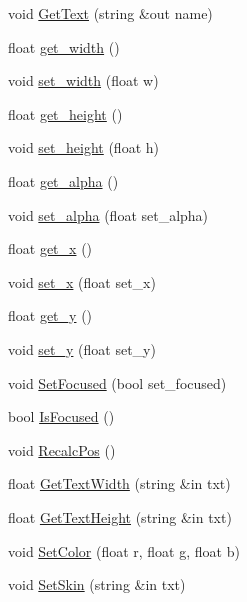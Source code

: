 \begin{DoxyCompactItemize}
\item 
void \hyperlink{class_g_u_i_label_af00099b304803c7f5651e5feadccf577}{Get\+Text} (string \&out name)
\item 
float \hyperlink{class_g_u_i_label_a19fc8eec7e832bf7b4371e61696c7a79}{get\+\_\+width} ()
\item 
void \hyperlink{class_g_u_i_label_a7d1513ef0f3b75fb17165b0a2ef077f3}{set\+\_\+width} (float w)
\item 
float \hyperlink{class_g_u_i_label_ac21bf1bcf1c89b92ea6369a6b1bbfe28}{get\+\_\+height} ()
\item 
void \hyperlink{class_g_u_i_label_ada3b44dba6446d9159e394360a480847}{set\+\_\+height} (float h)
\item 
float \hyperlink{class_g_u_i_label_a76e2bc539833f4f9bee774788d9da581}{get\+\_\+alpha} ()
\item 
void \hyperlink{class_g_u_i_label_a995d9405500c145f733ac4b35166e99e}{set\+\_\+alpha} (float set\+\_\+alpha)
\item 
float \hyperlink{class_g_u_i_label_ae6fe682d14ac2d4a70f3b1c85080608d}{get\+\_\+x} ()
\item 
void \hyperlink{class_g_u_i_label_a94ff861ea98f1ba34d3795ae8db00776}{set\+\_\+x} (float set\+\_\+x)
\item 
float \hyperlink{class_g_u_i_label_a9cb4a285368e8a93c6d1d063f60a445f}{get\+\_\+y} ()
\item 
void \hyperlink{class_g_u_i_label_a207dfc2274970c99eb0a92fa2170da90}{set\+\_\+y} (float set\+\_\+y)
\item 
void \hyperlink{class_g_u_i_label_a77cfcc05ceba3308ac2ceb693aa03077}{Set\+Focused} (bool set\+\_\+focused)
\item 
bool \hyperlink{class_g_u_i_label_a444a4f0b0a8db18dd259d9f1870099a4}{Is\+Focused} ()
\item 
void \hyperlink{class_g_u_i_label_af1fe8e2667914b28595d598acd834f99}{Recalc\+Pos} ()
\item 
float \hyperlink{class_g_u_i_label_a79b4350dbb50af2012fcf56654e94ce7}{Get\+Text\+Width} (string \&in txt)
\item 
float \hyperlink{class_g_u_i_label_a518d64b0380d931930737b9203ced913}{Get\+Text\+Height} (string \&in txt)
\item 
void \hyperlink{class_g_u_i_label_a244891e5099f5372bfe39efae20d6593}{Set\+Color} (float r, float g, float b)
\item 
void \hyperlink{class_g_u_i_label_a817cf661e6f1ab77f324aa0ceea53c50}{Set\+Skin} (string \&in txt)
\item 

\end{DoxyCompactItemize}
